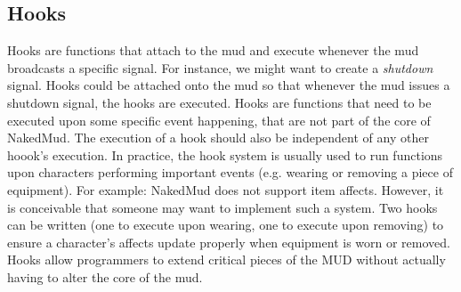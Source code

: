 \documentclass[fignum,doc]{article}
\begin{document}
\begin{doublespace}
\section{Hooks}
Hooks are functions that attach to the mud and execute whenever the mud broadcasts a specific signal. For instance, we might want to create a {\it shutdown} signal. Hooks could be attached onto the mud so that whenever the mud issues a shutdown signal, the hooks are executed. Hooks are functions that need to be executed upon some specific event happening, that are not part of the core of NakedMud. The execution of a hook should also be independent of any other hoook's execution. In practice, the hook system is usually used to run functions upon characters performing important events (e.g. wearing or removing a piece of equipment). For example: NakedMud does not support item affects. However, it is conceivable that someone may want to implement such a system. Two hooks can be written (one to execute upon wearing, one to execute upon removing) to ensure a character's affects update properly when equipment is worn or removed. Hooks allow programmers to extend critical pieces of the MUD without actually having 
to alter the core of the mud.




\end{doublespace}
\end{document}

